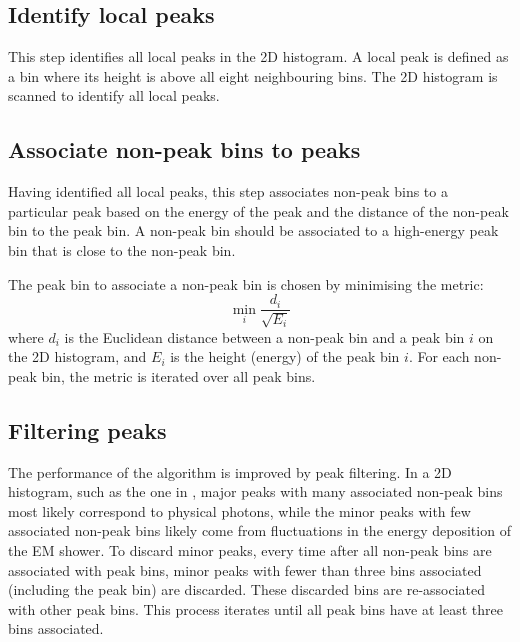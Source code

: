 \subsection{Identify local peaks}

This step identifies all local peaks in the 2D histogram. A local peak is defined as a bin where its height is above all eight neighbouring bins. The 2D histogram is scanned to identify all local peaks. %
\subsection{Associate non-peak bins to peaks}

Having identified all local peaks, this step associates non-peak bins to a particular peak based on the energy of the peak and the distance of the non-peak bin to the peak bin. A non-peak bin should be associated to a high-energy peak bin that is close to the non-peak bin.

The peak bin to associate a non-peak bin is chosen by minimising the metric:
\begin{equation}
\min_{i}\frac{d_{i}}{\sqrt{E_{i}}}
\end{equation}
where $d_{i}$ is the Euclidean distance between a non-peak bin and a  peak bin $i$ on the 2D histogram, and $E_{i}$ is the height (energy) of the peak bin $i$. For each non-peak bin, the metric is iterated over all peak bins. %


\subsection{Filtering peaks}

The performance of the \peakFinding algorithm is improved by peak filtering. In a 2D histogram, such as the one in , major peaks with many associated non-peak bins most likely correspond to physical photons, while the minor peaks with few associated non-peak bins  likely come from fluctuations in the energy deposition of the EM shower. To discard minor peaks, every time after all non-peak bins are associated with peak bins, minor peaks with fewer than three bins associated (including the peak bin) are discarded. These discarded bins are re-associated with other peak bins. This  process iterates until all peak bins have at least three bins associated.

